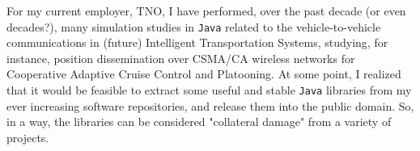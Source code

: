 For my current employer, TNO,
  I have performed, over the past decade
  (or even decades?),
  many simulation studies in \lstinline|Java|
  related to the vehicle-to-vehicle communications
  in (future) Intelligent Transportation Systems,
  studying, for instance,
  position dissemination over CSMA/CA wireless networks
  for Cooperative Adaptive Cruise Control
  and Platooning.
At some point,
  I realized that it would be feasible to
  extract some useful and stable
  \lstinline|Java| libraries from my ever increasing
  software repositories,
  and release them into the public domain.
So, in a way,
  the libraries can be considered "collateral damage" from a variety of projects.

